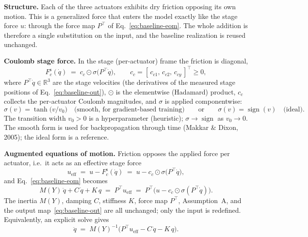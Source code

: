 \documentclass[11pt]{article}
\newcommand{\R}{\mathbb{R}}
\newcommand{\sgn}{\operatorname{sign}}
\newcommand{\ueff}{u_{\mathrm{eff}}}
\newcommand{\Fcs}{F_c^{\mathrm{s}}}
\begin{document}
\noindent\textbf{Structure.}\quad
Each of the three actuators exhibits dry friction opposing its own motion. This is a
generalized force that enters the model exactly like the stage force $u$: through the
force map $P^\top$ of Eq.~\eqref{eq:baseline-eom}. The whole addition is therefore a single
substitution on the input, and the baseline realization is reused unchanged.

\medskip\noindent\textbf{Coulomb stage force.}\quad
In the stage (per-actuator) frame the friction is diagonal,
\begin{equation}
  \Fcs(\dot q) \;=\; c_c \odot \sigma\!\big(P^\top \dot q\big),
  \qquad c_c = [\,c_{c1},\,c_{c2},\,c_{cy}\,]^\top \ge 0,
  \label{eq:coulomb-stage}
\end{equation}
where $P^\top \dot q \in \R^3$ are the stage velocities (the derivatives of the measured
stage positions of Eq.~\eqref{eq:baseline-out}), $\odot$ is the elementwise (Hadamard)
product, $c_c$ collects the per-actuator Coulomb magnitudes, and $\sigma$ is applied
componentwise:
\begin{equation}
  \sigma(v) = \tanh\!\big(v/v_0\big)\quad\text{(smooth, for gradient-based training)}
  \qquad\text{or}\qquad
  \sigma(v) = \sgn(v)\quad\text{(ideal)} .
  \label{eq:coulomb-sigma}
\end{equation}
The transition width $v_0>0$ is a hyperparameter (heuristic); $\sigma \to \sgn$ as
$v_0 \to 0$. The smooth form is used for backpropagation through time (Makkar \& Dixon,
2005); the ideal form is a reference.

\medskip\noindent\textbf{Augmented equations of motion.}\quad
Friction opposes the applied force per actuator, i.e.\ it acts as an effective stage force
\begin{equation}
  \ueff \;=\; u - \Fcs(\dot q) \;=\; u - c_c \odot \sigma\!\big(P^\top \dot q\big),
  \label{eq:coulomb-ueff}
\end{equation}
and Eq.~\eqref{eq:baseline-eom} becomes
\begin{equation}
  \boxed{\;M(Y)\,\ddot q + C\,\dot q + K\,q
    \;=\; P^\top \ueff
    \;=\; P^\top\!\big(u - c_c \odot \sigma(P^\top \dot q)\big).\;}
  \label{eq:coulomb-eom}
\end{equation}
The inertia $M(Y)$, damping $C$, stiffness $K$, force map $P^\top$, Assumption~A, and the
output map~\eqref{eq:baseline-out} are all unchanged; only the input is redefined.
Equivalently, an explicit solve gives
\begin{equation}
  \ddot q \;=\; M(Y)^{-1}\!\big(P^\top \ueff - C\,\dot q - K\,q\big).
  \label{eq:coulomb-explicit}
\end{equation}
\end{document}
